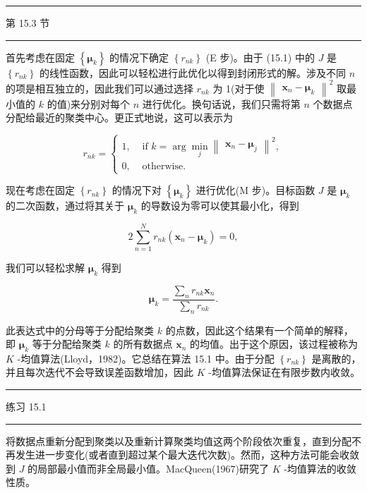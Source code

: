 \documentclass[10pt]{report}
\newcommand{\HRule}{\begin{center}\rule{0.9\linewidth}{0.2mm}\end{center}}
\begin{document}
\HRule

第 15.3 节

\HRule

首先考虑在固定 \(\left\{  {\mathbf{\mu }}_{k}\right\}\) 的情况下确定 \(\left\{  {r}_{nk}\right\}\) (E 步)。由于 (15.1) 中的 \(J\) 是 \(\left\{  {r}_{nk}\right\}\) 的线性函数，因此可以轻松进行此优化以得到封闭形式的解。涉及不同 \(n\) 的项是相互独立的，因此我们可以通过选择 \({r}_{nk}\) 为 1(对于使 \({\begin{Vmatrix}{\mathbf{x}}_{n} - {\mathbf{\mu }}_{k}\end{Vmatrix}}^{2}\) 取最小值的 \(k\) 的值)来分别对每个 \(n\) 进行优化。换句话说，我们只需将第 \(n\) 个数据点分配给最近的聚类中心。更正式地说，这可以表示为

\[
{r}_{nk} = \left\{  \begin{array}{ll} 1, & \text{ if }k = \arg \mathop{\min }\limits_{j}{\begin{Vmatrix}{\mathbf{x}}_{n} - {\mathbf{\mu }}_{j}\end{Vmatrix}}^{2}, \\  0, & \text{ otherwise. } \end{array}\right.  \tag{15.2}
\]

现在考虑在固定 \(\left\{  {r}_{nk}\right\}\) 的情况下对 \(\left\{  {\mathbf{\mu }}_{k}\right\}\) 进行优化(M 步)。目标函数 \(J\) 是 \({\mathbf{\mu }}_{k}\) 的二次函数，通过将其关于 \({\mathbf{\mu }}_{k}\) 的导数设为零可以使其最小化，得到

\[
2\mathop{\sum }\limits_{{n = 1}}^{N}{r}_{nk}\left( {{\mathbf{x}}_{n} - {\mathbf{\mu }}_{k}}\right)  = 0, \tag{15.3}
\]

我们可以轻松求解 \({\mathbf{\mu }}_{k}\) 得到

\[
{\mathbf{\mu }}_{k} = \frac{\mathop{\sum }\limits_{n}{r}_{nk}{\mathbf{x}}_{n}}{\mathop{\sum }\limits_{n}{r}_{nk}}. \tag{15.4}
\]

此表达式中的分母等于分配给聚类 \(k\) 的点数，因此这个结果有一个简单的解释，即 \({\mathbf{\mu }}_{k}\) 等于分配给聚类 \(k\) 的所有数据点 \({\mathbf{x}}_{n}\) 的均值。出于这个原因，该过程被称为 \(K\) -均值算法(Lloyd，1982)。它总结在算法 15.1 中。由于分配 \(\left\{  {r}_{nk}\right\}\) 是离散的，并且每次迭代不会导致误差函数增加，因此 \(K\) -均值算法保证在有限步数内收敛。

\HRule

练习 15.1

\HRule

将数据点重新分配到聚类以及重新计算聚类均值这两个阶段依次重复，直到分配不再发生进一步变化(或者直到超过某个最大迭代次数)。然而，这种方法可能会收敛到 \(J\) 的局部最小值而非全局最小值。MacQueen(1967)研究了 \(K\) -均值算法的收敛性质。
\end{document}
